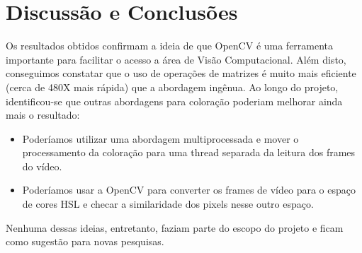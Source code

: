 \documentclass[conference]{IEEEtran}
\begin{document}
\section{Discussão e Conclusões}
Os resultados obtidos confirmam a ideia de que OpenCV é uma ferramenta importante para facilitar o acesso a área de Visão Computacional. 
Além disto, conseguimos constatar que o uso de operações de matrizes é muito mais eficiente (cerca de 480X mais rápida) que a abordagem ingênua. 
Ao longo do projeto, identificou-se que outras abordagens para coloração poderiam melhorar ainda mais o resultado: 
\begin{itemize}
\item Poderíamos utilizar uma abordagem multiprocessada e mover o processamento da coloração para uma thread separada da leitura dos frames do vídeo.
\item Poderíamos usar a OpenCV para converter os frames de vídeo para o espaço de cores HSL e checar a similaridade dos pixels nesse outro espaço.
\end{itemize}
Nenhuma dessas ideias, entretanto, faziam parte do escopo do projeto e ficam como sugestão para novas pesquisas.




\end{document}
